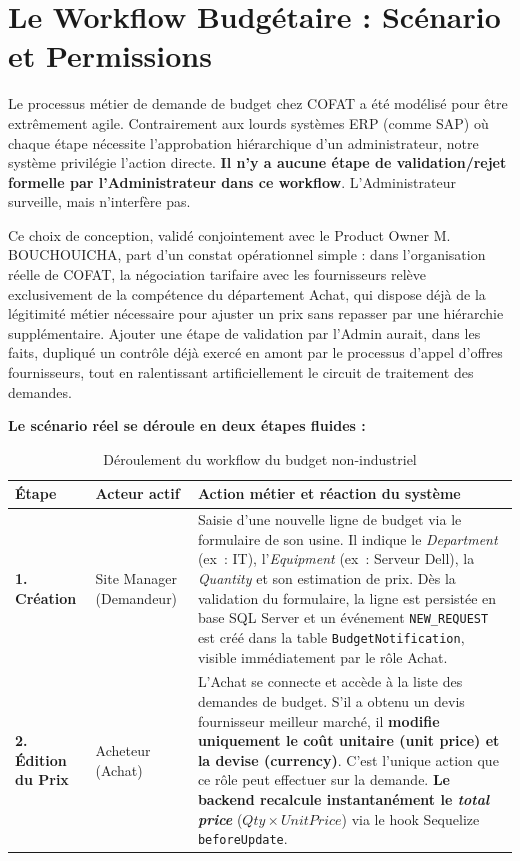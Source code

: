 \section{Le Workflow Budgétaire : Scénario et Permissions}
Le processus métier de demande de budget chez COFAT a été modélisé pour être extrêmement agile. Contrairement aux lourds systèmes ERP (comme SAP) où chaque étape nécessite l'approbation hiérarchique d'un administrateur, notre système privilégie l'action directe. \textbf{Il n'y a aucune étape de validation/rejet formelle par l'Administrateur dans ce workflow}. L'Administrateur surveille, mais n'interfère pas.

Ce choix de conception, validé conjointement avec le Product Owner M. BOUCHOUICHA, part d'un constat opérationnel simple : dans l'organisation réelle de COFAT, la négociation tarifaire avec les fournisseurs relève exclusivement de la compétence du département Achat, qui dispose déjà de la légitimité métier nécessaire pour ajuster un prix sans repasser par une hiérarchie supplémentaire. Ajouter une étape de validation par l'Admin aurait, dans les faits, dupliqué un contrôle déjà exercé en amont par le processus d'appel d'offres fournisseurs, tout en ralentissant artificiellement le circuit de traitement des demandes.

\textbf{Le scénario réel se déroule en deux étapes fluides :}

\begin{table}[h]
\centering
\begin{tabular}{|p{2cm}|p{3.5cm}|p{9.5cm}|}
\hline
\textbf{Étape} & \textbf{Acteur actif} & \textbf{Action métier et réaction du système} \\ \hline
\textbf{1. Création} & Site Manager (Demandeur) & Saisie d'une nouvelle ligne de budget via le formulaire de son usine. Il indique le \textit{Department} (ex~: IT), l'\textit{Equipment} (ex~: Serveur Dell), la \textit{Quantity} et son estimation de prix. Dès la validation du formulaire, la ligne est persistée en base SQL Server et un événement \texttt{NEW\_REQUEST} est créé dans la table \texttt{BudgetNotification}, visible immédiatement par le rôle Achat. \\ \hline
\textbf{2. Édition du Prix} & Acheteur (Achat) & L'Achat se connecte et accède à la liste des demandes de budget. S'il a obtenu un devis fournisseur meilleur marché, il \textbf{modifie uniquement le coût unitaire (unit price) et la devise (currency)}. C'est l'unique action que ce rôle peut effectuer sur la demande. \textbf{Le backend recalcule instantanément le \textit{total price}} ($Qty \times UnitPrice$) via le hook Sequelize \texttt{beforeUpdate}. \\ \hline
\end{tabular}
\caption{Déroulement du workflow du budget non-industriel}
\label{tab:workflow_budget}
\end{table}

